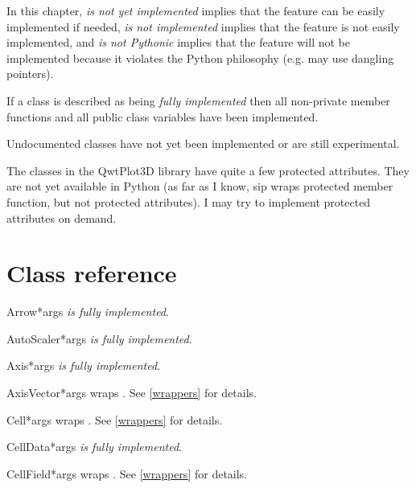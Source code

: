 \documentclass{manual}
\newcommand{\Future}{
  \begin{notice}[warning]
    The documentation is for the future PyQwt3D-0.1 which is only available
    from CVS.
  \end{notice}
}
\renewcommand{\Future}{}
\begin{document}
In this chapter, \emph{is not yet implemented} implies that the feature can
be easily implemented if needed, \emph{is not implemented} implies that the
feature is not easily implemented, and \emph{is not Pythonic} implies that
the feature will not be implemented because it violates the Python philosophy
(e.g. may use dangling pointers).

If a class is described as being \emph{fully implemented} then all non-private
member functions and all public class variables have been implemented.

Undocumented classes have not yet been implemented or are still experimental.

The classes in the QwtPlot3D library have quite a few protected attributes.
They are not yet available in Python (as far as I know, sip wraps protected
member function, but not protected attributes).
I may try to implement protected attributes on demand.


\section{Class reference \label{classes}}

\Future{}

\begin{classdesc}{Arrow}{*args}
\emph{is fully implemented}.
\end{classdesc}

\begin{classdesc}{AutoScaler}{*args}
\emph{is fully implemented}.
\end{classdesc}

\begin{classdesc}{Axis}{*args}
\emph{is fully implemented}.
\end{classdesc}

\begin{classdesc}{AxisVector}{*args}
wraps . See \ref{wrappers} for details.
\end{classdesc}

\begin{classdesc}{Cell}{*args}
wraps . See \ref{wrappers} for details.
\end{classdesc}

\begin{classdesc}{CellData}{*args}
\emph{is fully implemented}.
\end{classdesc}

\begin{classdesc}{CellField}{*args}
wraps . See \ref{wrappers} for details.
\end{classdesc}
\end{document}
